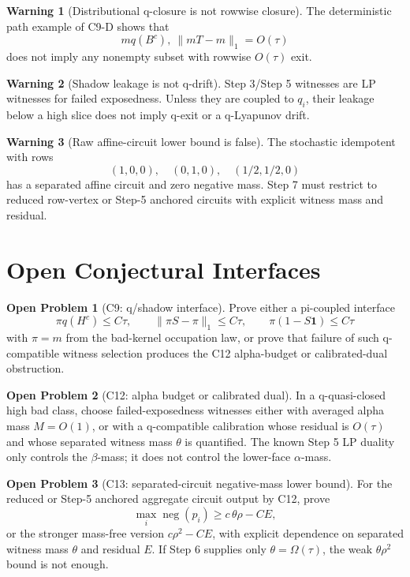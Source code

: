 \documentclass[11pt]{article}
\newcommand{\one}{\mathbf{1}}
\newcommand{\negm}{\operatorname{neg}}
\theoremstyle{definition}
\newtheorem{warning}{Warning}
\newtheorem{openproblem}{Open Problem}
\begin{document}
\begin{warning}[Distributional q-closure is not rowwise closure]
The deterministic path example of C9-D shows that
\[
  mq(B^c),\ \|mT-m\|_1=O(\tau)
\]
does not imply any nonempty subset with rowwise \(O(\tau)\) exit.
\end{warning}

\begin{warning}[Shadow leakage is not q-drift]
Step 3/Step 5 witnesses are LP witnesses for failed exposedness.  Unless they
are coupled to \(q_i\), their leakage below a high slice does not imply q-exit
or a q-Lyapunov drift.
\end{warning}

\begin{warning}[Raw affine-circuit lower bound is false]
The stochastic idempotent with rows
\[
  (1,0,0),\quad (0,1,0),\quad (1/2,1/2,0)
\]
has a separated affine circuit and zero negative mass.  Step 7 must restrict
to reduced row-vertex or Step-5 anchored circuits with explicit witness mass
and residual.
\end{warning}

\section{Open Conjectural Interfaces}

\begin{openproblem}[C9: q/shadow interface]
Prove either a pi-coupled interface
\[
  \pi q(H^c)\leq C\tau,\qquad
  \|\pi S-\pi\|_1\leq C\tau,\qquad
  \pi(1-S\one)\leq C\tau
\]
with \(\pi=m\) from the bad-kernel occupation law, or prove that failure of
such q-compatible witness selection produces the C12 alpha-budget or
calibrated-dual obstruction.
\end{openproblem}

\begin{openproblem}[C12: alpha budget or calibrated dual]
In a q-quasi-closed high bad class, choose failed-exposedness witnesses either
with averaged alpha mass \(M=O(1)\), or with a q-compatible calibration whose
residual is \(O(\tau)\) and whose separated witness mass \(\theta\) is
quantified.  The known Step 5 LP duality only controls the \(\beta\)-mass; it
does not control the lower-face \(\alpha\)-mass.
\end{openproblem}

\begin{openproblem}[C13: separated-circuit negative-mass lower bound]
For the reduced or Step-5 anchored aggregate circuit output by C12, prove
\[
  \max_i\negm(p_i)\geq c\,\theta\rho-C E,
\]
or the stronger mass-free version \(c\rho^2-CE\), with explicit dependence on
separated witness mass \(\theta\) and residual \(E\).  If Step 6 supplies only
\(\theta=\Omega(\tau)\), the weak \(\theta\rho^2\) bound is not enough.
\end{openproblem}
\end{document}

